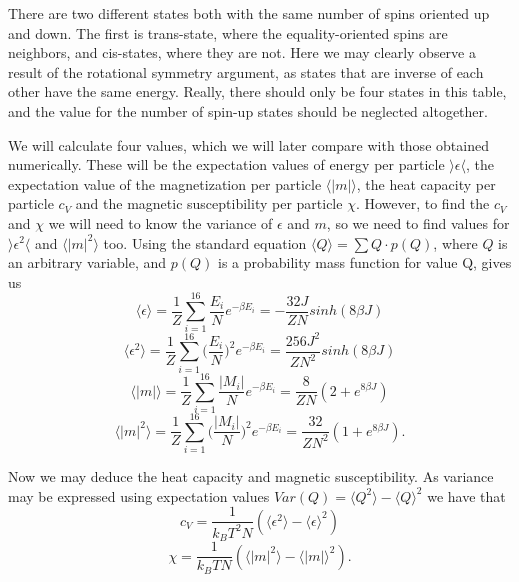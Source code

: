 \documentclass[english,notitlepage,reprint,nofootinbib]{revtex4-1}  %
\begin{document}
There are two different states both with the same number of spins oriented up and down. The first is trans-state, where the equality-oriented spins are neighbors, and cis-states, where they are not. Here we may clearly observe a result of the rotational symmetry argument, as states that are inverse of each other have the same energy. Really, there should only be four states in this table, and the value for the number of spin-up states should be neglected altogether.

We will calculate four values, which we will later compare with those obtained numerically. These will be the expectation values of energy per particle $\rangle  \epsilon \langle$, the expectation value of the magnetization per particle $\langle | m | \rangle$, the heat capacity per particle $c_V$ and the magnetic susceptibility per particle $\chi$. However, to find the $c_V$ and $\chi$ we will need to know the variance of $\epsilon$ and $m$, so we need to find values for $\rangle  \epsilon ^2 \langle$ and $\langle | m |^2 \rangle$ too. Using the standard equation $\langle Q \rangle = \sum Q \cdot p(Q) $, where $Q$ is an arbitrary variable, and $p(Q)$ is a probability mass function for value Q, gives us 
\begin{equation} \label{eq:7}
    \langle \epsilon \rangle = \frac{1}{Z} \sum_{i=1} ^{16} \frac{E_i}{N} e^{- \beta E_i} = - \frac{32J}{ZN} sinh(8 \beta J)
\end{equation}
\begin{equation}
    \langle \epsilon ^2 \rangle = \frac{1}{Z} \sum_{i=1} ^{16} \Big( \frac{E_i}{N} \Big)^2 e^{- \beta E_i} = \frac{256J^2}{ZN^2} sinh(8 \beta J)
\end{equation}
\begin{equation}
    \langle |m| \rangle = \frac{1}{Z} \sum_{i=1} ^{16} \frac{|M_i|}{N} e^{- \beta E_i} = \frac{8}{ZN}  (2 + e^{8 \beta J})
\end{equation}
\begin{equation}
    \langle |m| ^2 \rangle = \frac{1}{Z} \sum_{i=1} ^{16} \Big( \frac{|M_i|}{N} \Big)^2 e^{- \beta E_i} = \frac{32}{ZN^2} (1 + e^{8\beta J}).
\end{equation}

Now we may deduce the heat capacity and magnetic susceptibility. As variance may be expressed using expectation values $Var(Q) = \langle Q^2 \rangle - \langle Q \rangle ^2$ we have that
\begin{equation}
    c_V = \frac{1}{k_B T^2 N} (\langle \epsilon ^2 \rangle - \langle \epsilon \rangle ^2)
\end{equation}
\begin{equation}\label{eq:12}
    \chi = \frac{1}{k_B T N} (\langle |m|^2 \rangle - \langle |m| \rangle ^2).
\end{equation}
\end{document}
